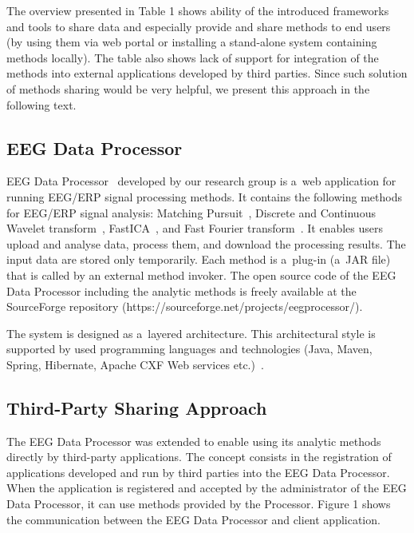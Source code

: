 \documentclass{frontiersSCNS} %
\begin{document}
The overview presented in Table 1 shows ability of the introduced frameworks and tools to share data and especially provide and share methods to end users (by using them via web portal or installing a stand-alone system containing methods locally). The table also shows lack of support for integration of the methods into external applications developed by third parties. Since such solution of methods sharing would be very helpful, we present this approach in the following text.

\subsection{EEG Data Processor}

EEG Data Processor~\cite{Jezek13} developed by our research group is a~web application for running EEG/ERP signal processing methods. It contains the following methods for EEG/ERP signal analysis: Matching Pursuit~\cite{Vareka12}, Discrete and Continuous Wavelet transform~\cite{Ciniburk10}, FastICA~\cite{Hyv01}, and Fast Fourier transform~\cite{FFT}. It enables users upload and analyse data, process them, and download the processing results. The input data are stored  only temporarily. Each method is a~plug-in (a~JAR file) that is called by an external method invoker. The open source code of the EEG Data Processor including the analytic methods is freely available at the SourceForge repository (https://sourceforge.net/projects/eegprocessor/).

The system is designed as a~layered architecture. This architectural style is supported by used programming languages and technologies (Java, Maven, Spring, Hibernate, Apache CXF Web services etc.)~\cite{Jezek13}.

\subsection{Third-Party Sharing Approach}

The EEG Data Processor was extended to enable using its analytic methods directly by third-party applications. The concept consists in the registration of applications developed and run by third parties into the EEG Data Processor. When the application is registered and accepted by the administrator of the EEG Data Processor, it can use methods provided by the Processor. Figure 1 shows the communication between the EEG Data Processor and client application.
\end{document}
